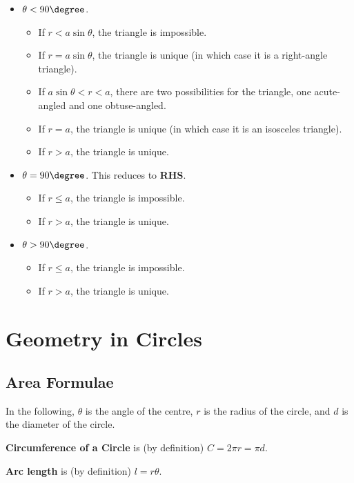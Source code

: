 \documentclass{article}
\begin{document}
\begin{itemize}
    \item \(\theta < 90\degree\).
    \begin{itemize}
        \item If \(r < a \sin \theta\), the triangle is impossible.
        \item If \(r = a \sin \theta\), the triangle is unique (in which case it is a right-angle triangle).
        \item If \(a \sin \theta < r < a\), there are two possibilities for the triangle, one acute-angled and one obtuse-angled.
        \item If \(r = a\), the triangle is unique (in which case it is an isosceles triangle).
        \item If \(r > a\), the triangle is unique.
    \end{itemize}

    \item \(\theta = 90 \degree\). This reduces to \textbf{RHS}.
    \begin{itemize}
        \item If \(r \leq a\), the triangle is impossible.
        \item If \(r > a\), the triangle is unique.
    \end{itemize}

    \item \(\theta > 90 \degree\).
    \begin{itemize}
        \item If \(r \leq a\), the triangle is impossible.
        \item If \(r > a\), the triangle is unique.
    \end{itemize}
\end{itemize}

\section{Geometry in Circles}
\subsection{Area Formulae}

In the following, \(\theta\) is the angle of the centre, \(r\) is the radius of the circle, and \(d\) is the diameter of the circle.

\textbf{Circumference of a Circle} is (by definition) \(C = 2 \pi r = \pi d\).

\textbf{Arc length} is (by definition) \(l = r \theta\).
\end{document}
